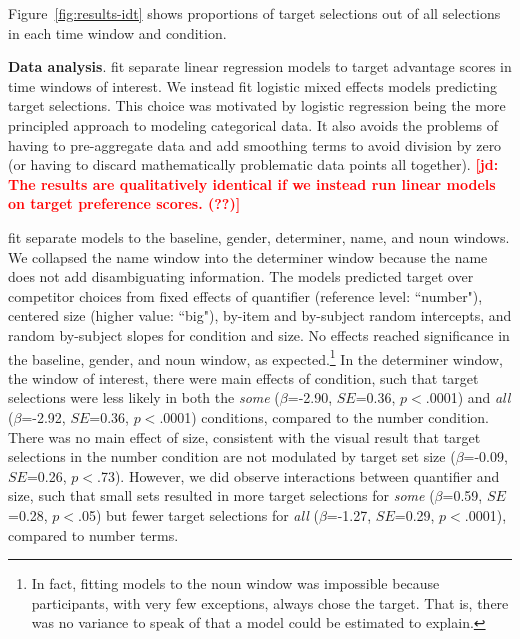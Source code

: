 \documentclass[10pt,letterpaper]{article}
\newcommand{\figref}[1]{Figure~\ref{#1}}
\newcommand{\jd}[1]{\textcolor{Red}{\textbf{[jd: #1]}}}
\begin{document}
\figref{fig:results-idt} shows proportions of target selections out of all selections in each time window and condition. 


\textbf{Data analysis}.  fit separate linear regression models to target advantage scores in time windows of interest. We instead fit logistic mixed effects models predicting target selections. This choice was motivated by logistic regression being the more principled approach to modeling categorical data. It also avoids the problems of having to pre-aggregate data and add smoothing terms to avoid division by zero (or having to discard mathematically problematic data points all together). \jd{The results are qualitatively identical if we instead run linear models on target preference scores. (??)}

 fit separate models to the baseline, gender, determiner, name, and noun windows. We collapsed the name window into the determiner window because the name does not add disambiguating information. The models predicted target over competitor choices from fixed effects of quantifier (reference level: ``number"), centered size (higher value: ``big"), by-item and by-subject random intercepts, and random by-subject slopes for condition and size. No effects reached significance in the baseline, gender, and noun window, as expected.\footnote{In fact, fitting models to the noun window was impossible because participants, with very few exceptions, always chose the target. That is, there was no variance to speak of that a model could be estimated to explain.}  In the determiner window, the window of interest, there were main effects of condition, such that target selections were less likely in both the \emph{some} ($\beta$=-2.90, $SE$=0.36, $p<$.0001) and \emph{all} ($\beta$=-2.92, $SE$=0.36, $p<$.0001) conditions, compared to the number condition. There was no main effect of size, consistent with the visual result that target selections in the number condition are not modulated by  target set size ($\beta$=-0.09, $SE$=0.26, $p<$.73). However, we did observe interactions between quantifier and size, such that small sets resulted in more target selections for \emph{some} ($\beta$=0.59, $SE$=0.28, $p<$.05) but fewer target selections for \emph{all} ($\beta$=-1.27, $SE$=0.29, $p<$.0001), compared to number terms. 

\end{document}
